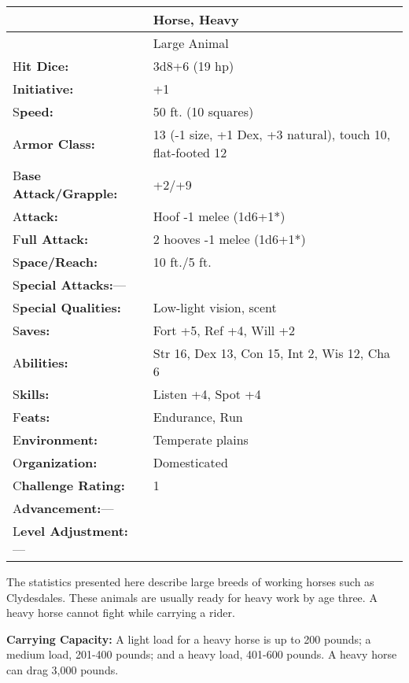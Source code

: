 \documentclass{article}
\begin{document}
\begin{tabular}{|>{\raggedright}p{91pt}|>{\raggedright}p{226pt}|}
\hline
 & Horse, Heavy\tabularnewline
\hline
 & Large Animal\tabularnewline
\hline
H\textbf{it Dice:} & 3d8+6 (19 hp)\tabularnewline
\hline
I\textbf{nitiative:} & +1\tabularnewline
\hline
S\textbf{peed:} & 50 ft. (10 squares)\tabularnewline
\hline
A\textbf{rmor Class:} & 13 (-1 size, +1 Dex, +3 natural), touch 10, flat-footed 
12\tabularnewline
\hline
B\textbf{ase Attack/Grapple:} & +2/+9\tabularnewline
\hline
A\textbf{ttack:} & Hoof -1 melee (1d6+1*)\tabularnewline
\hline
F\textbf{ull Attack:} & 2 hooves -1 melee (1d6+1*)\tabularnewline
\hline
S\textbf{pace/Reach:} & 10 ft./5 ft.\tabularnewline
\hline
S\textbf{pecial Attacks:}--- & \tabularnewline
\hline
S\textbf{pecial Qualities:} & Low-light vision, scent\tabularnewline
\hline
S\textbf{aves:} & Fort +5, Ref +4, Will +2\tabularnewline
\hline
A\textbf{bilities:} & Str 16, Dex 13, Con 15, Int 2, Wis 12, Cha 6\tabularnewline
\hline
S\textbf{kills:} & Listen +4, Spot +4\tabularnewline
\hline
F\textbf{eats:} & Endurance, Run\tabularnewline
\hline
E\textbf{nvironment:} & Temperate plains\tabularnewline
\hline
O\textbf{rganization:} & Domesticated\tabularnewline
\hline
C\textbf{hallenge Rating:} & 1\tabularnewline
\hline
A\textbf{dvancement:}--- & \tabularnewline
\hline
L\textbf{evel Adjustment:}--- & \tabularnewline
\hline
\end{tabular}

The statistics presented here describe large breeds of working horses such as Clydesdales. 
These animals are usually ready for heavy work by age three. A heavy horse cannot 
fight while carrying a rider.

\textbf{Carrying Capacity:} A light load for a heavy horse is up to 200 pounds; 
a medium load, 201-400 pounds; and a heavy load, 401-600 pounds. A heavy horse 
can drag 3,000 pounds.
\end{document}
